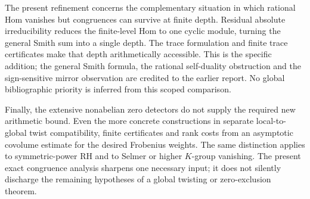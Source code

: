 The present refinement concerns the complementary situation in which
rational Hom vanishes but congruences can survive at finite depth.
Residual absolute irreducibility reduces the finite-level Hom to one
cyclic module, turning the general Smith sum into a single depth.
The trace formulation and finite trace certificates make that depth
arithmetically accessible. This is the specific addition; the general
Smith formula, the rational self-duality obstruction and the sign-sensitive
mirror observation are credited to the earlier report. No global
bibliographic priority is inferred from this scoped comparison.
\cite{priorstruct,priorinventory}

Finally, the extensive nonabelian zero detectors do not supply the required
new arithmetic bound. Even the more concrete constructions in
 separate local-to-global twist
compatibility, finite certificates and rank costs from an asymptotic
covolume estimate for the desired Frobenius weights. The same distinction
applies to symmetric-power RH and to Selmer or higher $K$-group vanishing.
The present exact congruence analysis sharpens one necessary input; it
does not silently discharge the remaining hypotheses of a global
twisting or zero-exclusion theorem.\cite{priorbridges,priorstruct}

